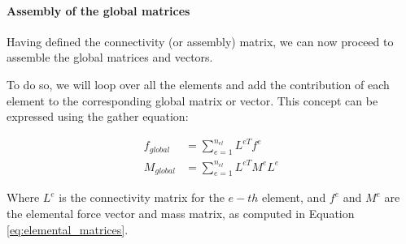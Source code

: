 \paragraph{Assembly of the global matrices}

Having defined the connectivity (or assembly) matrix, we can now proceed to assemble the global matrices and vectors.

To do so, we will loop over all the elements and add the contribution of each element to the corresponding global matrix or vector.
This concept can be expressed using the gather equation:

\begin{align}
    f_{global} & = \sum_{e=1}^{n_{el}} L^{eT} f^e     \\
    M_{global} & = \sum_{e=1}^{n_{el}} L^{eT} M^e L^e
\end{align}

Where $L^e$ is the connectivity matrix for the $e-th$ element, and $f^e$ and $M^e$ are the elemental force vector and mass matrix, as computed in Equation \ref{eq:elemental_matrices}.